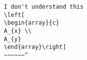 \begin{verbatim}
I don't understand this
\left[
\begin{array}{c}
A_{x} \\ 
A_{y}
\end{array}\right]
~~~~~~^
\end{verbatim}
